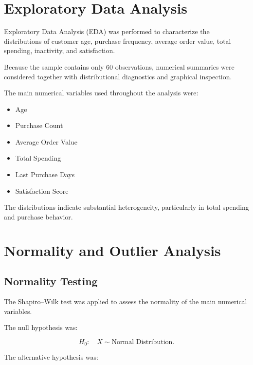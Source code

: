 \documentclass[11pt,a4paper]{article}
\newcommand{\Hnull}{H_{0}}
\begin{document}

\section{Exploratory Data Analysis}

Exploratory Data Analysis (EDA) was performed to characterize the distributions of customer age, purchase frequency, average order value, total spending, inactivity, and satisfaction.

Because the sample contains only 60 observations, numerical summaries were considered together with distributional diagnostics and graphical inspection.

The main numerical variables used throughout the analysis were:

\begin{itemize}
    \item Age
    \item Purchase Count
    \item Average Order Value
    \item Total Spending
    \item Last Purchase Days
    \item Satisfaction Score
\end{itemize}

The distributions indicate substantial heterogeneity, particularly in total spending and purchase behavior.


\section{Normality and Outlier Analysis}

\subsection{Normality Testing}

The Shapiro--Wilk test was applied to assess the normality of the main numerical variables.

The null hypothesis was:

\[
\Hnull:\quad X \sim \text{Normal Distribution}.
\]

The alternative hypothesis was:
\end{document}
